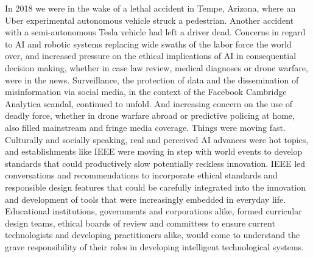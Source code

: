 \documentclass[11pt,dvipdfm]{article}
\begin{document}
In 2018 we were in the wake of a lethal accident in Tempe, Arizona, where an Uber experimental autonomous vehicle struck a pedestrian.  Another accident with a semi-autonomous Tesla vehicle had left a driver dead.  Concerns in regard to AI and robotic systems replacing wide swaths of the labor force the world over, and increased pressure on the ethical implications of AI in consequential decision making, whether in case law review, medical diagnoses or drone warfare, were in the news.  Surveillance, the protection of data and the dissemination of misinformation via social media, in the context of the Facebook Cambridge Analytica scandal, continued to unfold.  And increasing concern on the use of deadly force, whether in drone warfare abroad or predictive policing at home, also filled mainstream and fringe media coverage.  Things were moving fast.  Culturally and socially speaking, real and perceived AI advances were hot topics, and establishments like IEEE were moving in step with world events to develop standards that could productively slow potentially reckless innovation.  IEEE led conversations and recommendations to incorporate ethical standards and responsible design features that could be carefully integrated into the innovation and development of tools that were increasingly embedded in everyday life.   Educational institutions, governments and corporations alike, formed curricular design teams, ethical boards of review and committees to ensure current technologists and developing practitioners alike, would come to understand the grave responsibility of their roles in developing intelligent technological systems. 
\end{document}
